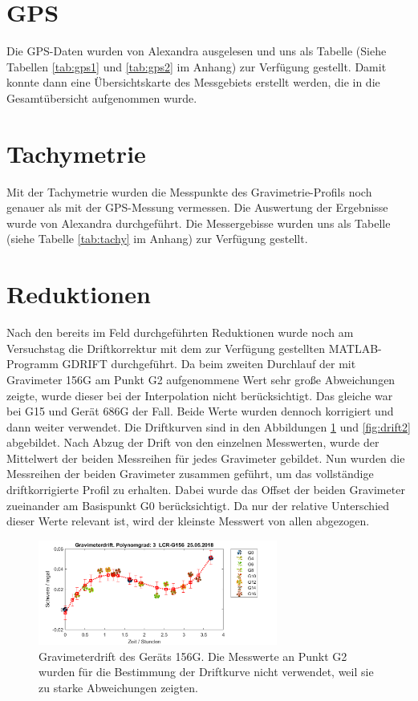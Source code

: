 \section{GPS}

Die GPS-Daten wurden von Alexandra ausgelesen und uns als Tabelle (Siehe Tabellen \ref{tab:gps1} und \ref{tab:gps2} im Anhang) zur Verfügung gestellt. Damit konnte dann eine Übersichtskarte des Messgebiets erstellt werden, die in die Gesamtübersicht aufgenommen wurde.

\section{Tachymetrie}

Mit der Tachymetrie wurden die Messpunkte des Gravimetrie-Profils noch genauer als mit der GPS-Messung vermessen. Die Auswertung der Ergebnisse wurde von Alexandra durchgeführt. Die Messergebisse wurden uns als Tabelle (siehe Tabelle \ref{tab:tachy} im Anhang) zur Verfügung gestellt.

\section{Reduktionen}

Nach den bereits im Feld durchgeführten Reduktionen wurde noch am Versuchstag die Driftkorrektur mit dem zur Verfügung gestellten MATLAB-Programm GDRIFT durchgeführt. Da beim zweiten Durchlauf der mit Gravimeter 156G am Punkt G2 aufgenommene Wert sehr große Abweichungen zeigte, wurde dieser bei der Interpolation nicht berücksichtigt. Das gleiche war bei G15 und Gerät 686G der Fall. Beide Werte wurden dennoch korrigiert und dann weiter verwendet. Die Driftkurven sind in den Abbildungen \ref{fig:drift1} und \ref{fig:drift2} abgebildet. Nach Abzug der Drift von den einzelnen Messwerten, wurde der Mittelwert der beiden Messreihen für jedes Gravimeter gebildet. Nun wurden die Messreihen der beiden Gravimeter zusammen geführt, um das vollständige driftkorrigierte Profil zu erhalten. Dabei wurde das Offset der beiden Gravimeter zueinander am Basispunkt G0 berücksichtigt. Da nur der relative Unterschied dieser Werte relevant ist, wird der kleinste Messwert von allen abgezogen.

\begin{figure}[!ht]
 \centering
 \includegraphics[width=0.7\textwidth]{fig/G156drift_endgultig}
 \caption[Gravimeterdrift des Geräts 156G]{Gravimeterdrift des Geräts 156G. Die Messwerte an Punkt G2 wurden für die Bestimmung der Driftkurve nicht verwendet, weil sie zu starke Abweichungen zeigten.}
 \label{fig:drift1}
\end{figure}

